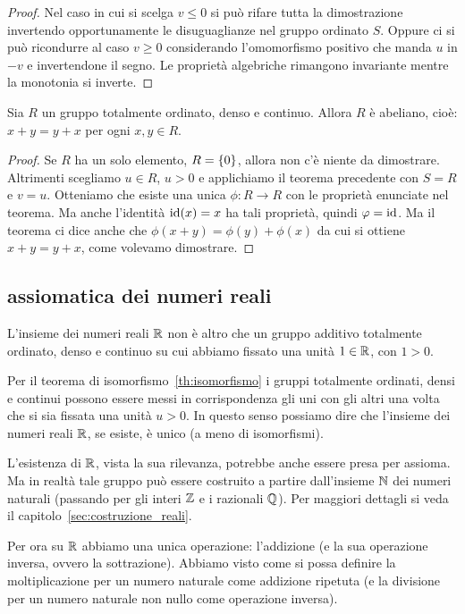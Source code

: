 \begin{proof}
Nel caso in cui si scelga $v\le 0$ si può rifare tutta la dimostrazione 
invertendo opportunamente le disuguaglianze nel gruppo ordinato $S$.
Oppure ci si può ricondurre al caso $v\ge 0$ considerando l'omomorfismo 
positivo che manda $u$ in $-v$ e invertendone il segno.
Le proprietà algebriche rimangono invariante mentre la monotonia si inverte.
\end{proof}

\begin{theorem}[commutatività]
  Sia $R$ un gruppo totalmente ordinato, denso e continuo. 
  Allora $R$ è abeliano, cioè: $x+y=y+x$ per ogni $x,y\in R$.
\end{theorem}
%
\begin{proof}
Se $R$ ha un solo elemento, $R={\left\{ 0 \right\}}$, allora non c'è niente da dimostrare.
Altrimenti scegliamo $u\in R$, $u>0$ e applichiamo il teorema precedente 
con $S=R$ e $v=u$. 
Otteniamo che esiste una unica $\phi\colon R\to R$ con le proprietà 
enunciate nel teorema. 
Ma anche l'identità $\mathrm{id}(x)=x$ ha tali proprietà, quindi $\varphi =\mathrm{id}$.
Ma il teorema ci dice anche che $\phi(x+y) = \phi(y)+\phi(x)$ da cui si ottiene
$x+y=y+x$, come volevamo dimostrare.
\end{proof}

\subsection{assiomatica dei numeri reali}

L'insieme dei numeri reali ${\mathbb R}$ non è altro che un gruppo additivo 
totalmente ordinato, denso e continuo su cui abbiamo fissato una unità 
$1\in {\mathbb R}$, con $1>0$.

Per il teorema di isomorfismo~\ref{th:isomorfismo}
i gruppi totalmente ordinati, densi e continui 
possono essere messi in corrispondenza gli uni con gli altri 
una volta che si sia fissata una unità $u>0$. 
In questo senso possiamo dire che l'insieme dei numeri reali 
${\mathbb R}$, se esiste, è unico (a meno di isomorfismi).

L'esistenza di ${\mathbb R}$, vista la sua rilevanza, potrebbe anche essere presa 
per assioma. 
Ma in realtà tale gruppo può essere costruito a partire dall'insieme ${\mathbb N}$ 
dei numeri naturali (passando per gli interi ${\mathbb Z}$ e i razionali ${\mathbb Q}$). 
Per maggiori dettagli si veda il capitolo~\ref{sec:costruzione_reali}.

Per ora su ${\mathbb R}$ abbiamo una unica operazione: l'addizione 
(e la sua operazione inversa, ovvero la sottrazione).
Abbiamo visto come si possa definire la moltiplicazione per un numero naturale 
come addizione ripetuta (e la divisione per un numero naturale non nullo 
come operazione inversa). 

